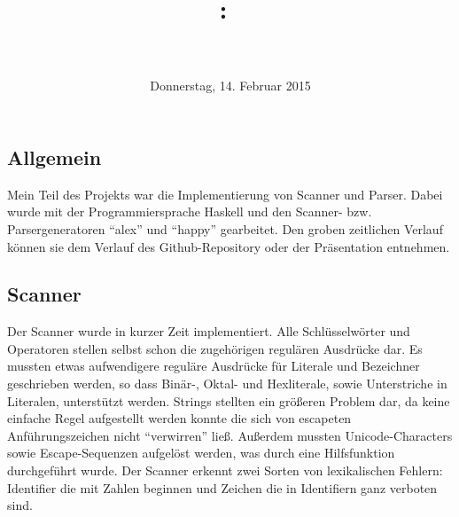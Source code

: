 \documentclass{article}
\title{
  \vspace{2in}
  \textmd{\textbf{\hmwkClass:\ \hmwkTitle}}\\
  \vspace{0.1in}\large{\textit{\hmwkClassInstructor\ \hmwkClassTime}}
  \vspace{3in}
}
\author{\textbf{\hmwkAuthorName}}
\date{Donnerstag, 14. Februar 2015} %
\begin{document}
  
  \maketitle
  
  
  
  \newpage
  
  
  
  \subsection{Allgemein}
  Mein Teil des Projekts war die Implementierung von Scanner und Parser. Dabei wurde mit der Programmiersprache Haskell und den Scanner- bzw. Parsergeneratoren ``alex'' und ``happy'' gearbeitet. Den groben zeitlichen Verlauf können sie dem Verlauf des Github-Repository oder der Präsentation entnehmen.
  \subsection{Scanner}
  Der Scanner wurde in kurzer Zeit implementiert. Alle Schlüsselwörter und Operatoren stellen selbst schon die zugehörigen regulären Ausdrücke dar. Es mussten etwas aufwendigere reguläre Ausdrücke für Literale und Bezeichner geschrieben werden, so dass Binär-, Oktal- und Hexliterale, sowie Unterstriche in Literalen, unterstützt werden. Strings stellten ein größeren Problem dar, da keine einfache Regel aufgestellt werden konnte die sich von escapeten Anführungszeichen nicht ``verwirren'' ließ. Außerdem mussten Unicode-Characters sowie Escape-Sequenzen aufgelöst werden, was durch eine Hilfsfunktion durchgeführt wurde. Der Scanner erkennt zwei Sorten von lexikalischen Fehlern: Identifier die mit Zahlen beginnen und Zeichen die in Identifiern ganz verboten sind.
\end{document}
